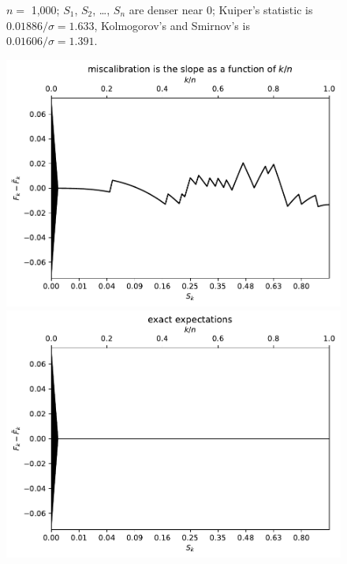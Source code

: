 \documentclass{article}
\begin{document}
\begin{figure}
\begin{centering}
\end{centering}
\caption{$n =$ 1,000; $S_1$, $S_2$, \dots, $S_n$ are denser near 0;
         Kuiper's statistic is $0.01886 / \sigma = 1.633$,
         Kolmogorov's and Smirnov's is $0.01606 / \sigma = 1.391$.}
\label{1000_00}
\end{figure}


\begin{figure}
\begin{centering}

\parbox{\imsize}{\includegraphics[width=\imsize]
                {./codes/unweighted/100_4_1_3/cumulative.pdf}}
\quad\quad
\parbox{\imsize}{\includegraphics[width=\imsize]
                {./codes/unweighted/100_4_1_3/cumulative_exact.pdf}}


\end{centering}
\end{figure}
\end{document}
